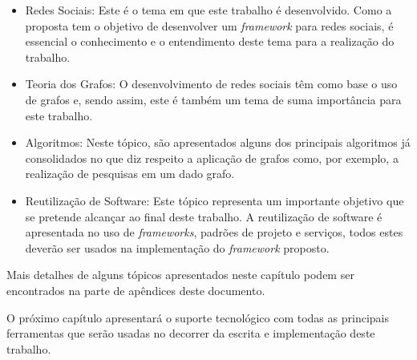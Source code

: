 \begin{itemize}
	\item Redes Sociais: Este é o tema em que este trabalho é desenvolvido. Como a proposta tem o objetivo de desenvolver um \textit{framework} para redes sociais, é essencial o conhecimento e o entendimento deste tema para a realização do trabalho.
	\item Teoria dos Grafos: O desenvolvimento de redes sociais têm como base o uso de grafos e, sendo assim, este é também um tema de suma importância para este trabalho.
	\item Algoritmos: Neste tópico, são apresentados alguns dos principais algoritmos já consolidados no que diz respeito a aplicação de grafos como, por exemplo, a realização de pesquisas em um dado grafo.
	\item Reutilização de Software: Este tópico representa um importante objetivo que se pretende alcançar ao final deste trabalho. A reutilização de software é apresentada no uso de \textit{frameworks}, padrões de projeto e serviços, todos estes deverão ser usados na implementação do \textit{framework} proposto.
\end{itemize}

Mais detalhes de alguns tópicos apresentados neste capítulo podem ser encontrados na parte de apêndices deste documento.

O próximo capítulo apresentará o suporte tecnológico com todas as principais ferramentas que serão usadas no decorrer da escrita e implementação deste trabalho.
